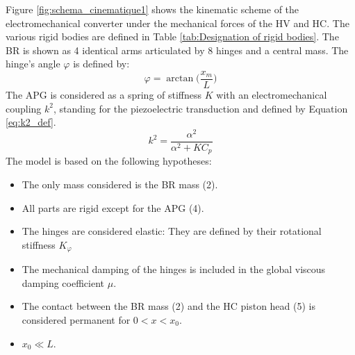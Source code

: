 \documentclass[3p,twocolumn,preprint]{elsarticle}
\begin{document}
Figure \ref{fig:schema_cinematique1} shows the kinematic scheme of the electromechanical converter under the mechanical forces of the HV and HC. The various rigid bodies are defined in Table \ref{tab:Designation of rigid bodies}. The BR is shown as 4 identical arms articulated by 8 hinges and a central mass. The hinge's angle $\varphi$ is defined by:
\begin{equation}
	\varphi = \arctan\biggl(\dfrac{x_m}{L}\biggr)
	\label{eq:phi_definition}
\end{equation}
The APG is considered as a spring of stiffness $K$ with an electromechanical coupling $k^2$, standing for the piezoelectric transduction and defined by Equation \ref{eq:k2_def}.\\
\begin{equation}
	k^2 = \dfrac{\alpha^2}{\alpha^2 +  K C_p}
	\label{eq:k2_def}
\end{equation}
The model is based on the following hypotheses:
\begin{itemize}
	\item The only mass considered is the BR mass (2).
	\item All parts are rigid except for the APG (4).
	\item The hinges are considered elastic: They are defined by their rotational stiffness $K_{\varphi}$
	\item The mechanical damping of the hinges is included in the global viscous damping coefficient $\mu$.
	\item The contact between the BR mass (2) and the HC piston head (5) is considered permanent for $0 < x < x_0$.
	\item \mbox{$x_0 \ll L$}. 
\end{itemize}

\begin{table}[!htbp]
\centering
{}
\caption{Definition of figure \ref{fig:schema_cinematique1} bodies}
\label{tab:Designation of rigid bodies}
\end{table}
\end{document}
